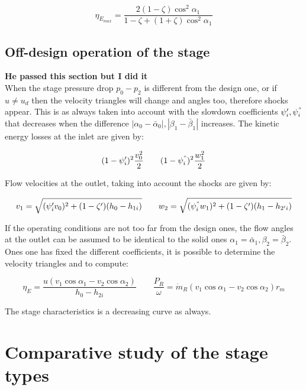 \begin{equation}
\eta _{E_{max}} = \frac{2(1-\zeta)\cos ^2 \alpha _1 }{1 - \zeta + (1+\zeta) \cos ^2 \alpha _1}
\end{equation} 

\subsection{Off-design operation of the stage}
\textbf{He passed this section but I did it}\\

When the stage pressure drop $p_0 - p_2$ is different from the design one, or if $u\neq u_d$ then the velocity triangles will change and angles too, therefore shocks appear. This is as always taken into account with the slowdown coefficients $\psi '_i ,\psi ^"_i$ that decreases when the difference $|\alpha _0 - \bar{\alpha}_0|, |\beta _1 - \bar{\beta}_1|$ increases. The kinetic energy losses at the inlet are given by: 

\begin{equation}
(1 - \psi '_i)^2\frac{v_0^2}{2} \qquad (1 - \psi _i^")^2\frac{w_1^2}{2}
\end{equation}

Flow velocities at the outlet, taking into account the shocks are given by: 

\begin{equation}
v_1 = \sqrt{(\psi ' _i v_0)^2 + (1 - \zeta ')(h_0 - h_{1i})} \qquad w_2 = \sqrt{(\psi ^" _i w_1)^2 + (1 - \zeta ')(h_1 - h_{2'i})}
\end{equation}

If the operating conditions are not too far from the design ones, the flow angles at the outlet can be assumed to be identical to the solid ones $\alpha _1 = \bar{\alpha}_1, \beta _2 = \bar{\beta} _2$. Ones one has fixed the different coefficients, it is possible to determine the velocity triangles and to compute:
 
 \begin{equation}
 \eta _E = \frac{u(v_1 \cos \alpha _1 - v_2 \cos \alpha _2)}{h_0 - h_{2i}} \qquad \frac{P_R}{\omega} = \dot{m}_R (v_1 \cos \alpha _1 - v_2 \cos \alpha _2) r_m
 \end{equation}
 
 The stage characteristics is a decreasing curve as always. 
 
\section{Comparative study of the stage types}
